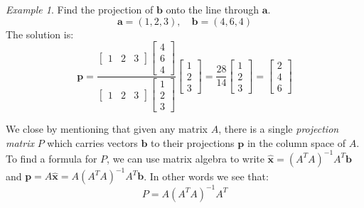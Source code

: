 \documentclass[11pt,oneside]{amsbook}
\theoremstyle{definition}
\theoremstyle{plain}
\theoremstyle{definition}
\theoremstyle{remark}
\newtheorem{example}[theorem]{Example}
\numberwithin{equation}{section}
\numberwithin{figure}{section}
\begin{document}
\begin{example}
  Find the projection of $\mathbf{b}$ onto the line through $\mathbf{a}$.
  \[\mathbf{a}=(1,2,3),\quad \mathbf{b}=(4,6,4)
  \]
  The solution is:
  \[\mathbf{p}=\frac{\begin{bmatrix}1&2&3\end{bmatrix}
  \begin{bmatrix}4\\6\\4\end{bmatrix}}
  {\begin{bmatrix}1&2&3\end{bmatrix}\begin{bmatrix}1\\2\\3\end{bmatrix}}
  \begin{bmatrix}1\\2\\3\end{bmatrix}
  =\frac{28}{14}\begin{bmatrix}1\\2\\3\end{bmatrix}
  =\begin{bmatrix}2\\4\\6\end{bmatrix}
  \]
\end{example}

We close by mentioning that given any matrix $A$, there is a single \emph{projection matrix} $P$ which carries vectors $\mathbf{b}$ to their projections $\mathbf{p}$ in the column space of $A$. To find a formula for $P$, we can use matrix algebra to write $\hat{\mathbf{x}}=(A^TA)^{-1}A^T\mathbf{b}$ and $\mathbf{p}=A\hat{\mathbf{x}}=A(A^TA)^{-1}A^T\mathbf{b}$. In other words we see that:
\[P=A(A^TA)^{-1}A^T
\]
\end{document}
